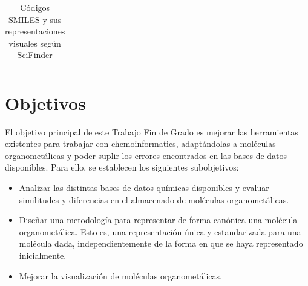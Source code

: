 \begin{landscape}
\begin{table}
\begin{minipage}{.5\linewidth}
\begin{tabular}{m{5cm}>{\centering\arraybackslash}m{4cm}}
        \hline
        \end{tabular}
    \caption{Códigos SMILES y sus representaciones visuales según SciFinder}
    \label{tabla:tabla_peq_intro_sciFinder}
  \end{minipage}
\end{table}
\end{landscape}





\section{Objetivos}
El objetivo principal de este Trabajo Fin de Grado es mejorar las herramientas existentes para trabajar con chemoinformatics, adaptándolas a moléculas organometálicas y poder suplir los errores encontrados en las bases de datos disponibles. Para ello, se establecen los siguientes subobjetivos:
\begin{itemize}
    \item Analizar las distintas bases de datos químicas disponibles y evaluar similitudes y diferencias en el almacenado de moléculas organometálicas.
    \item Diseñar una metodología para representar de forma canónica una molécula organometálica. Esto es, una representación única y estandarizada para una molécula dada, independientemente de la forma en que se haya representado inicialmente.
    \item Mejorar la visualización de moléculas organometálicas.
\end{itemize} 

